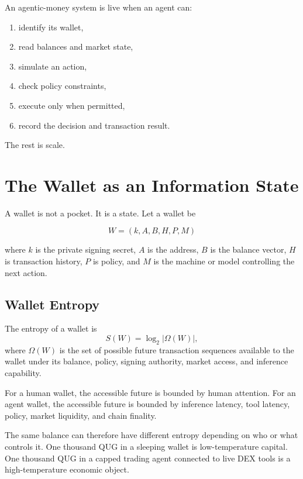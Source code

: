 \documentclass[11pt,a4paper]{article}
\begin{document}
\begin{codexbox}
An agentic-money system is live when an agent can:
\begin{enumerate}[leftmargin=1.2cm]
  \item identify its wallet,
  \item read balances and market state,
  \item simulate an action,
  \item check policy constraints,
  \item execute only when permitted,
  \item record the decision and transaction result.
\end{enumerate}
The rest is scale.
\end{codexbox}

\section{The Wallet as an Information State}

A wallet is not a pocket. It is a state. Let a wallet be

\[
W = (k, A, B, H, P, M)
\]

where \(k\) is the private signing secret, \(A\) is the address, \(B\) is the balance vector, \(H\) is transaction history, \(P\) is policy, and \(M\) is the machine or model controlling the next action.

\subsection{Wallet Entropy}

\begin{principlebox}
The entropy of a wallet is
\[
S(W) = \log_2 |\Omega(W)|,
\]
where \(\Omega(W)\) is the set of possible future transaction sequences available to the wallet under its balance, policy, signing authority, market access, and inference capability.
\end{principlebox}

For a human wallet, the accessible future is bounded by human attention. For an agent wallet, the accessible future is bounded by inference latency, tool latency, policy, market liquidity, and chain finality.

The same balance can therefore have different entropy depending on who or what controls it. One thousand QUG in a sleeping wallet is low-temperature capital. One thousand QUG in a capped trading agent connected to live DEX tools is a high-temperature economic object.
\end{document}
